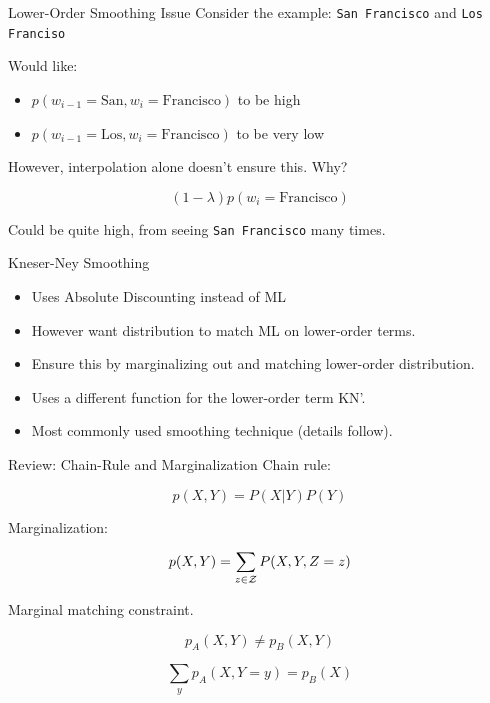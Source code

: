 \documentclass{beamer}
\begin{document}
\begin{frame}{Lower-Order Smoothing Issue}
  Consider the example: \texttt{San Francisco} and \texttt{Los Franciso}

  Would like:

  \begin{itemize}
  \item $p(w_{i-1} = \mathrm{San}, w_i = \mathrm{Francisco})$ to be high
  \item $p(w_{i-1} = \mathrm{Los}, w_i = \mathrm{Francisco})$ to be very low
  \end{itemize}

  However, interpolation alone doesn't ensure this. Why?

  \pause

  \[(1-\lambda) p(w_i = \mathrm{Francisco})\]
  
  Could be quite high, from seeing \texttt{San Francisco} many times.

\end{frame}

\begin{frame}{Kneser-Ney Smoothing}
  \begin{itemize}
  \item Uses Absolute Discounting instead of ML
    \air 

  \item However want distribution to match ML on lower-order terms.
    \air

  \item Ensure this by marginalizing out and matching lower-order distribution.
    \air 

  \item Uses a different function for the lower-order term KN'. 
    \air 

  \item Most commonly used smoothing technique (details follow).
  \end{itemize}
\end{frame}

\begin{frame}{Review: Chain-Rule and Marginalization}
  Chain rule:
  
  \[ p(X, Y) = P(X| Y) P(Y) \] 

  Marginalization:

  \[ p(X, Y) = \sum_{z \in \mathcal{Z}} P(X, Y, Z=z) \] 

  Marginal matching constraint. 
  
  
  \[p_A(X, Y) \neq p_B(X, Y) \]

  
  \[\sum_y p_A(X, Y=y) = p_B(X) \]

\end{frame}
\end{document}
